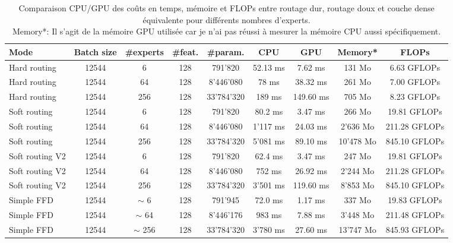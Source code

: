 \documentclass{article}
\begin{document}
\begin{table}[t]
\centering
\setlength{\tabcolsep}{4pt}
\renewcommand{\arraystretch}{1.0}
\begin{tabular*}{\textwidth}{@{\extracolsep{\fill}} | l | c | c c c | c c c c |}
\hline
\textbf{Mode} & \textbf{Batch size} & \textbf{\#experts} & \textbf{\#feat.} & \textbf{\#param.} &
\textbf{CPU} & \textbf{GPU} & \textbf{Memory*} & \textbf{FLOPs} \\
\hline
Hard routing & 12544 & 6   & 128 &   791'820    & 52.13 ms &   7.62 ms  &   131 Mo  &   6.63 GFLOPs \\
Hard routing & 12544 & 64  & 128 &  8'446'080  & 78 ms &  38.32 ms  &   261 Mo  &   7.00 GFLOPs \\
Hard routing & 12544 & 256 & 128 & 33'784'320  & 189 ms & 149.60 ms  &   705 Mo  &   8.23 GFLOPs \\
\hline
Soft routing & 12544 & 6   & 128 &   791'820   & 80.2 ms &   3.47 ms  &   266 Mo  &  19.81 GFLOPs \\
Soft routing & 12544 & 64  & 128 &  8'446'080  & 1'117 ms &  24.03 ms  & 2'636 Mo  & 211.28 GFLOPs \\
Soft routing & 12544 & 256 & 128 & 33'784'320 &  5'081 ms  &  89.10 ms  &10'478 Mo  & 845.10 GFLOPs \\
\hline
Soft routing V2 & 12544 & 6   & 128 &   791'820   & 62.4 ms &   3.47 ms  &   247 Mo  &  19.81 GFLOPs \\
Soft routing V2 & 12544 & 64  & 128 &  8'446'080 & 752 ms &  26.92 ms  & 2'244 Mo  & 211.28 GFLOPs \\
Soft routing V2 & 12544 & 256 & 128 & 33'784'320 & 3'501 ms  & 119.60 ms  & 8'853 Mo  & 845.10 GFLOPs \\
\hline
Simple FFD & 12544 & $\sim$ 6   & 128 &   791'945    & 72.0 ms&   1.17 ms  &   337 Mo  &  19.83 GFLOPs \\
Simple FFD & 12544 & $\sim$ 64  & 128 &  8'446'176   & 983 ms &   7.88 ms  & 3'448 Mo  & 211.48 GFLOPs \\
Simple FFD & 12544 & $\sim$ 256 & 128 & 33'784'320  & 3'780 ms &  27.60 ms  & 13'747 Mo  & 845.93 GFLOPs \\
\hline

\end{tabular*}
\caption{Comparaison CPU/GPU des coûts en temps, mémoire et FLOPs entre routage dur,
routage doux et couche dense équivalente pour différents nombres d'experts.\\
Memory*: Il s'agit de la mémoire GPU utilisée car je n'ai pas réussi à mesurer la mémoire CPU aussi spécifiquement.}
\label{tab:cpu_gpu_routing}
\end{table}
\end{document}
